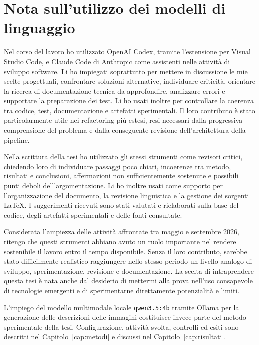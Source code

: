 \chapter*{Nota sull'utilizzo dei modelli di linguaggio}

Nel corso del lavoro ho utilizzato OpenAI Codex, tramite l'estensione per Visual Studio Code, e Claude Code di Anthropic come assistenti nelle attività di sviluppo software. Li ho impiegati soprattutto per mettere in discussione le mie scelte progettuali, confrontare soluzioni alternative, individuare criticità, orientare la ricerca di documentazione tecnica da approfondire, analizzare errori e supportare la preparazione dei test. Li ho usati inoltre per controllare la coerenza tra codice, test, documentazione e artefatti sperimentali. Il loro contributo è stato particolarmente utile nei refactoring più estesi, resi necessari dalla progressiva comprensione del problema e dalla conseguente revisione dell'architettura della pipeline.

Nella scrittura della tesi ho utilizzato gli stessi strumenti come revisori critici, chiedendo loro di individuare passaggi poco chiari, incoerenze tra metodo, risultati e conclusioni, affermazioni non sufficientemente sostenute e possibili punti deboli dell'argomentazione. Li ho inoltre usati come supporto per l'organizzazione del documento, la revisione linguistica e la gestione dei sorgenti \LaTeX{}. I suggerimenti ricevuti sono stati valutati e rielaborati sulla base del codice, degli artefatti sperimentali e delle fonti consultate.

Considerata l'ampiezza delle attività affrontate tra maggio e settembre 2026, ritengo che questi strumenti abbiano avuto un ruolo importante nel rendere sostenibile il lavoro entro il tempo disponibile. Senza il loro contributo, sarebbe stato difficilmente realistico raggiungere nello stesso periodo un livello analogo di sviluppo, sperimentazione, revisione e documentazione. La scelta di intraprendere questa tesi è nata anche dal desiderio di mettermi alla prova nell'uso consapevole di tecnologie emergenti e di sperimentarne direttamente potenzialità e limiti.

L'impiego del modello multimodale locale \texttt{qwen3.5:4b} tramite Ollama per la generazione delle descrizioni delle immagini costituisce invece parte del metodo sperimentale della tesi. Configurazione, attività svolta, controlli ed esiti sono descritti nel Capitolo~\ref{cap:metodi} e discussi nel Capitolo~\ref{cap:risultati}.